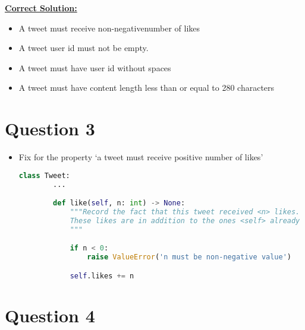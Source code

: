 \documentclass[12pt]{article}
\begin{document}
\begin{mdframed}
    \underline{\textbf{Correct Solution:}}

    \bigskip

    \begin{itemize}
        \item A tweet must receive \color{red}non-negative\color{black}\:number of likes
        \item \color{red}A tweet user id must not be empty.\color{black}
        \item A tweet must have user id without spaces
        \item \color{red} A tweet must have content length less than or equal to 280 characters\color{black}
    \end{itemize}

\end{mdframed}

\section*{Question 3}
\begin{itemize}
    \item  Fix for the property `a tweet must receive positive number of likes'

    \begin{lstlisting}[language=Python]
    class Tweet:
        ...

        def like(self, n: int) -> None:
            """Record the fact that this tweet received <n> likes.
            These likes are in addition to the ones <self> already has.
            """

            if n < 0:
                raise ValueError('n must be non-negative value')

            self.likes += n
    \end{lstlisting}

\end{itemize}


\section*{Question 4}
\end{document}
